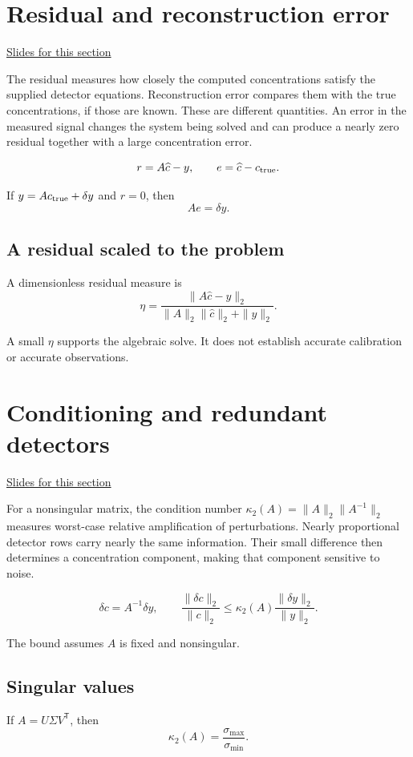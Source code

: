 \documentclass[11pt,letterpaper]{article}
\theoremstyle{definition}\newtheorem{definition}{Definition}\newtheorem{example}{Example}
\numberwithin{equation}{section}
\begin{document}
\section{Residual and reconstruction error}
\hypertarget{note-residual-and-reconstruction-error}{}\label{note:residual-and-reconstruction-error}
{\small \href{slides.html\#frame=residual-and-reconstruction-error\&step=1}{Slides for this section}}\par
The residual measures how closely the computed concentrations satisfy the supplied detector equations. Reconstruction error compares them with the true concentrations, if those are known. These are different quantities. An error in the measured signal changes the system being solved and can produce a nearly zero residual together with a large concentration error.

\[
r=A\widehat c-y,\qquad e=\widehat c-c_{\rm true}.
\]

If $y=Ac_{\rm true}+\delta y$ and $r=0$, then
\[
Ae=\delta y.
\]

\subsection*{A residual scaled to the problem}
A dimensionless residual measure is
\[
\eta=\frac{\|A\widehat c-y\|_2}{\|A\|_2\|\widehat c\|_2+\|y\|_2}.
\]

A small $\eta$ supports the algebraic solve. It does not establish accurate calibration or accurate observations.
\section{Conditioning and redundant detectors}
\hypertarget{note-conditioning-and-redundant-detectors}{}\label{note:conditioning-and-redundant-detectors}
{\small \href{slides.html\#frame=conditioning-and-redundant-detectors\&step=1}{Slides for this section}}\par
For a nonsingular matrix, the condition number $\kappa_2(A)=\|A\|_2\|A^{-1}\|_2$ measures worst-case relative amplification of perturbations. Nearly proportional detector rows carry nearly the same information. Their small difference then determines a concentration component, making that component sensitive to noise.

\[
\delta c=A^{-1}\delta y,
\qquad
\frac{\|\delta c\|_2}{\|c\|_2}\leq\kappa_2(A)\frac{\|\delta y\|_2}{\|y\|_2}.
\]

The bound assumes $A$ is fixed and nonsingular.

\subsection*{Singular values}
If $A=U\Sigma V^{\mathsf T}$, then
\[
\kappa_2(A)=\frac{\sigma_{\max}}{\sigma_{\min}}.
\]
\end{document}
